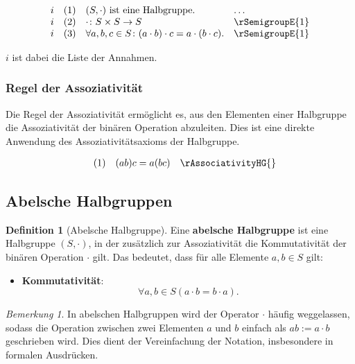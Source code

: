 \documentclass{book}
\theoremstyle{plain}
\theoremstyle{remark}
\newtheorem*{remark}{Bemerkung}
\theoremstyle{definition}
\newtheorem{definition}{Definition}[section]
\begin{document}
\[
\begin{array}{llll}
    i       & (1) & (S, \cdot) \text{ ist eine Halbgruppe.} & \dots \\
    i       & (2) & \cdot \colon S \times S \to S& \rSemigroupE{1} \\
    i       & (3) & \forall a, b, c \in S \colon (a \cdot b) \cdot c = a \cdot (b \cdot c). & \rSemigroupE{1}
\end{array}
\]

\(i\) ist dabei die Liste der Annahmen.

\subsubsection*{Regel der Assoziativität}
\label{rule:rAssociativityHG}
Die Regel der Assoziativität ermöglicht es, aus den Elementen einer Halbgruppe die Assoziativität der binären Operation abzuleiten. Dies ist eine direkte Anwendung des Assoziativitätsaxioms der Halbgruppe.

\[
\begin{array}{llll}
        & (1) & (ab)c = a(bc) & \rAssociativityHG{}
\end{array}
\]


\subsection{Abelsche Halbgruppen}

\begin{definition}[Abelsche Halbgruppe]
    Eine \textbf{abelsche Halbgruppe} ist eine Halbgruppe \((S, \cdot)\), in der zusätzlich zur Assoziativität die Kommutativität der binären Operation \(\cdot\) gilt. Das bedeutet, dass für alle Elemente \(a, b \in S\) gilt:
    
    \begin{itemize}
        \item \textbf{Kommutativität}:
        \[
        \forall a, b \in S(a \cdot b = b \cdot a).
        \]
    \end{itemize}
\end{definition}

\begin{remark}
    In abelschen Halbgruppen wird der Operator \(\cdot\) häufig weggelassen, sodass die Operation zwischen zwei Elementen \(a\) und \(b\) einfach als \(ab := a \cdot b\) geschrieben wird. Dies dient der Vereinfachung der Notation, insbesondere in formalen Ausdrücken.
\end{remark}
\end{document}
